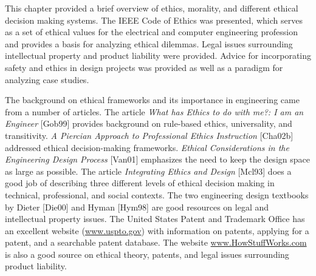 This chapter provided a brief overview of ethics, morality, and
different ethical decision making systems. The IEEE Code of Ethics was
presented, which serves as a set of ethical values for the electrical
and computer engineering profession and provides a basis for analyzing
ethical dilemmas. Legal issues surrounding intellectual property and
product liability were provided. Advice for incorporating safety and
ethics in design projects was provided as well as a paradigm for
analyzing case studies.

The background on ethical frameworks and its importance in engineering
came from a number of articles. The article \emph{What has Ethics to do
with me?: I am an Engineer} {[}Gob99{]} provides background on
rule-based ethics, universality, and transitivity. \emph{A Piercian
Approach to Professional Ethics Instruction} {[}Cha02b{]} addressed
ethical decision-making frameworks. \emph{Ethical Considerations in the
Engineering Design Process} {[}Van01{]} emphasizes the need to keep the
design space as large as possible. The article \emph{Integrating Ethics
and Design} {[}Mcl93{]} does a good job of describing three different
levels of ethical decision making in technical, professional, and social
contexts. The two engineering design textbooks by Dieter {[}Die00{]} and
Hyman {[}Hym98{]} are good resources on legal and intellectual property
issues. The United States Patent and Trademark Office has an excellent
website (\href{http://www.uspto.gov}{www.uspto.gov}) with information on
patents, applying for a patent, and a searchable patent database. The
website \href{http://www.HowStuffWorks.com}{www.HowStuffWorks.com} is
also a good source on ethical theory, patents, and legal issues
surrounding product liability.

